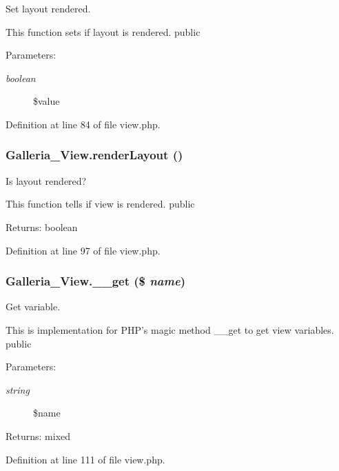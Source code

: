 Set layout rendered.

This function sets if layout is rendered.  public \begin{Desc}
\item[Parameters:]
\begin{description}
\item[{\em boolean}]\$value \end{description}
\end{Desc}


Definition at line 84 of file view.php.
\subsubsection{\setlength{\rightskip}{0pt plus 5cm}Galleria\_\-View.renderLayout ()}\label{classGalleria__View_436d48470953c6319232ce8ed69264b9}


Is layout rendered?

This function tells if view is rendered.  public \begin{Desc}
\item[Returns:]boolean \end{Desc}


Definition at line 97 of file view.php.
\subsubsection{\setlength{\rightskip}{0pt plus 5cm}Galleria\_\-View.\_\-\_\-get (\$ {\em name})}\label{classGalleria__View_7fb269fe68a449c8fd0ed547b35e0ce5}


Get variable.

This is implementation for PHP's magic method \_\-\_\-get to get view variables.  public \begin{Desc}
\item[Parameters:]
\begin{description}
\item[{\em string}]\$name \end{description}
\end{Desc}
\begin{Desc}
\item[Returns:]mixed \end{Desc}


Definition at line 111 of file view.php.
